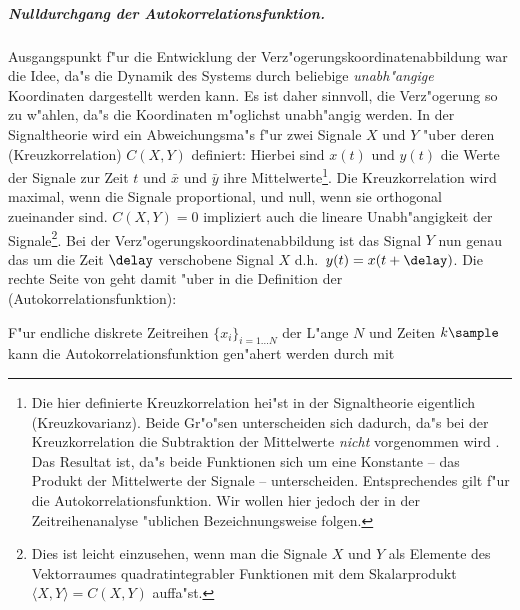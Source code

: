 \subparagraph{Nulldurchgang der Autokorrelationsfunktion.} Ausgangspunkt f"ur die
Entwicklung der Verz"ogerungskoordinatenabbildung war die Idee, da"s die Dynamik des
Systems durch beliebige \emph{unabh"angige} Koordinaten dargestellt werden kann. Es ist
daher sinnvoll, die Verz"ogerung so zu w"ahlen, da"s die Koordinaten m"oglichst
unabh"angig werden. In der Signaltheorie wird ein Abweichungsma"s f"ur zwei Signale $X$
und $Y$ "uber deren \begriff(Kreuzkorrelation) $C(X,Y)$ definiert:
 Hierbei sind $x(t)$ und $y(t)$ die Werte der Signale zur
Zeit $t$ und $\bar x$ und $\bar y$ ihre Mittelwerte\footnote{Die hier definierte
  Kreuzkorrelation hei"st in der Signaltheorie eigentlich \begriff(Kreuzkovarianz). Beide
  Gr"o"sen unterscheiden sich dadurch, da"s bei der Kreuzkorrelation die Subtraktion der
  Mittelwerte {\em nicht} vorgenommen wird \cite{Lueke92}. Das Resultat ist, da"s beide
  Funktionen sich um eine Konstante -- das Produkt der Mittelwerte der Signale --
  unterscheiden. Entsprechendes gilt f"ur die Autokorrelationsfunktion. Wir wollen hier
  jedoch der in der Zeitreihenanalyse "ublichen Bezeichnungsweise folgen. }.  Die
Kreuzkorrelation wird maximal, wenn die Signale proportional, und null, wenn sie
orthogonal zueinander sind. $C(X,Y)=0$ impliziert auch die lineare Unabh"angigkeit der
Signale\footnote{Dies ist leicht einzusehen, wenn man die Signale $X$ und $Y$ als Elemente des
  Vektorraumes quadratintegrabler Funktionen mit dem Skalarprodukt $\langle X,Y \rangle=C(X,Y)$ auffa"st.}.
Bei der Verz"ogerungskoordinatenabbildung ist das Signal $Y$ nun genau das um die Zeit
$\delay$ verschobene Signal $X$ d.h.\ $y(t)=x(t+\delay)$.  Die rechte Seite von
 geht damit "uber in die Definition der \begriff(Autokorrelationsfunktion):


F"ur endliche diskrete Zeitreihen $\{x_i\}_{i=1\dots N}$ der L"ange $N$ und Zeiten
$k\sample$ kann die Autokorrelationsfunktion gen"ahert werden durch
mit

